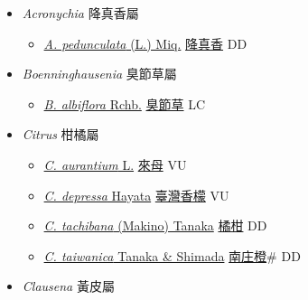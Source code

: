 
  \begin{itemize}
 \item[] \textit{Acronychia} 降真香屬
                    
  \begin{itemize}
        \item[] \href{http://www.theplantlist.org/tpl1.1/search?q=Acronychia+pedunculata}{\textit{A. pedunculata} (L.) Miq.}   \href{\detokenize{http://taibnet.sinica.edu.tw/chi/taibnet_species_list.php?T2=降真香&T2_new_value=true&fr=y}}{降真香} DD
  \end{itemize}
 \item[] \textit{Boenninghausenia} 臭節草屬
                    
  \begin{itemize}
        \item[] \href{http://www.theplantlist.org/tpl1.1/search?q=Boenninghausenia+albiflora}{\textit{B. albiflora} Rchb.}   \href{\detokenize{http://taibnet.sinica.edu.tw/chi/taibnet_species_list.php?T2=臭節草&T2_new_value=true&fr=y}}{臭節草} LC
  \end{itemize}
 \item[] \textit{Citrus} 柑橘屬
                    
  \begin{itemize}
        \item[] \href{http://www.theplantlist.org/tpl1.1/search?q=Citrus+aurantium}{\textit{C. aurantium} L.}   \href{\detokenize{http://taibnet.sinica.edu.tw/chi/taibnet_species_list.php?T2=來母&T2_new_value=true&fr=y}}{來母} VU
        \item[] \href{http://www.theplantlist.org/tpl1.1/search?q=Citrus+depressa}{\textit{C. depressa} Hayata}   \href{\detokenize{http://taibnet.sinica.edu.tw/chi/taibnet_species_list.php?T2=臺灣香檬&T2_new_value=true&fr=y}}{臺灣香檬} VU
        \item[] \href{http://www.theplantlist.org/tpl1.1/search?q=Citrus+tachibana}{\textit{C. tachibana} (Makino) Tanaka}   \href{\detokenize{http://taibnet.sinica.edu.tw/chi/taibnet_species_list.php?T2=橘柑&T2_new_value=true&fr=y}}{橘柑} DD
        \item[] \href{http://www.theplantlist.org/tpl1.1/search?q=Citrus+taiwanica}{\textit{C. taiwanica} Tanaka \& Shimada}   \href{\detokenize{http://taibnet.sinica.edu.tw/chi/taibnet_species_list.php?T2=南庄橙&T2_new_value=true&fr=y}}{南庄橙}\# DD
  \end{itemize}
 \item[] \textit{Clausena} 黃皮屬
                    

\end{itemize}
